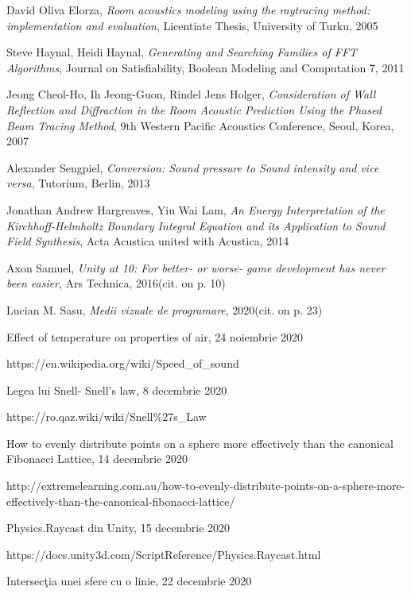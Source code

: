 \begin{thebibliography}{99.}%

 David Oliva Elorza, \textit{Room acoustics modeling using the raytracing method: implementation and evaluation}, Licentiate Thesis, University of Turku, 2005

 Steve Haynal, Heidi Haynal, \textit{Generating and Searching Families of FFT Algorithms}, Journal on Satisfiability, Boolean Modeling and Computation 7, 2011

 Jeong Cheol-Ho, Ih Jeong-Guon, Rindel Jens Holger, \textit{Consideration of Wall Reflection and Diffraction in the Room Acoustic Prediction Using the Phased Beam Tracing Method}, 9th Western Pacific Acoustics Conference, Seoul, Korea, 2007

 Alexander Sengpiel, \textit{Conversion: Sound pressure to Sound intensity and vice versa}, Tutorium, Berlin, 2013

 Jonathan Andrew Hargreaves, Yiu Wai Lam, \textit{An Energy Interpretation of the Kirchhoff-Helmholtz Boundary Integral Equation and its Application to Sound Field Synthesis}, Acta Acustica united with Acustica, 2014

 Axon Samuel, \textit{Unity at 10: For better- or worse- game development has never been easier}, Ars Technica, 2016(cit. on p. 10)

 Lucian M. Sasu, \textit{Medii vizuale de programare}, 2020(cit. on p. 23)

 Effect of temperature on properties of air, 24 noiembrie 2020

https://en.wikipedia.org/wiki/Speed\_of\_sound

 Legea lui Snell- Snell's law, 8 decembrie 2020

https://ro.qaz.wiki/wiki/Snell\%27s\_Law

 How to evenly distribute points on a sphere more effectively than the canonical Fibonacci Lattice, 14 decembrie 2020

http://extremelearning.com.au/how-to-evenly-distribute-points-on-a-sphere-more-effectively-than-the-canonical-fibonacci-lattice/

 Physics.Raycast din Unity, 15 decembrie 2020

https://docs.unity3d.com/ScriptReference/Physics.Raycast.html 

 Intersec\c{t}ia unei sfere cu o linie, 22 decembrie 2020


\end{thebibliography}
